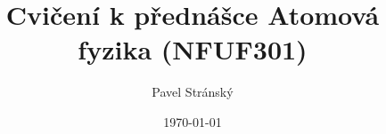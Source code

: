 \documentclass[a4paper,11pt,twoside]{article}
\newcommand{\np}{\clearpage\setcounter{page}{1}\newpage}
\begin{document}
\makeatletter
{}
\renewcommand{\theequation}{\arabic{section}.\arabic{subsection}.\arabic{equation}}
\renewcommand{\thepage}{\arabic{section}.\arabic{page}}
\makeatother

\title{Cvičení k přednášce Atomová fyzika (NFUF301)}
\date{\today}
\author{Pavel Stránský}

\maketitle
{}
\tableofcontents\np

\np

\printindex

%
\printbibliography
%
\end{document}
